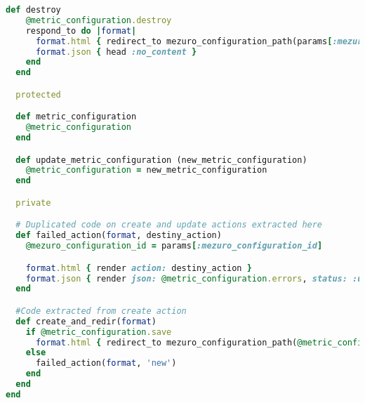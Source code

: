 \begin{lstlisting}[language=Ruby]
  def destroy
    @metric_configuration.destroy
    respond_to do |format|
      format.html { redirect_to mezuro_configuration_path(params[:mezuro_configuration_id]) }
      format.json { head :no_content }
    end
  end

  protected

  def metric_configuration
    @metric_configuration
  end

  def update_metric_configuration (new_metric_configuration)
    @metric_configuration = new_metric_configuration
  end

  private

  # Duplicated code on create and update actions extracted here
  def failed_action(format, destiny_action)
    @mezuro_configuration_id = params[:mezuro_configuration_id]

    format.html { render action: destiny_action }
    format.json { render json: @metric_configuration.errors, status: :unprocessable_entity }
  end

  #Code extracted from create action
  def create_and_redir(format)
    if @metric_configuration.save
      format.html { redirect_to mezuro_configuration_path(@metric_configuration.configuration_id), notice: 'Metric Configuration was successfully created.' }
    else
      failed_action(format, 'new')
    end
  end
end

\end{lstlisting}

%
%
%


